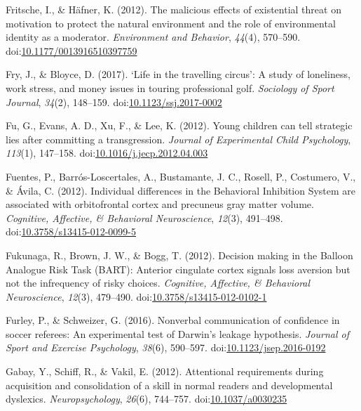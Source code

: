 \documentclass[english,man]{apa6}
\begin{document}
\hypertarget{ref-Fritsche2012}{}
Fritsche, I., \& Häfner, K. (2012). The malicious effects of existential
threat on motivation to protect the natural environment and the role of
environmental identity as a moderator. \emph{Environment and Behavior},
\emph{44}(4), 570--590.
doi:\href{https://doi.org/10.1177/0013916510397759}{10.1177/0013916510397759}

\hypertarget{ref-Fry2017}{}
Fry, J., \& Bloyce, D. (2017). `Life in the travelling circus': A study
of loneliness, work stress, and money issues in touring professional
golf. \emph{Sociology of Sport Journal}, \emph{34}(2), 148--159.
doi:\href{https://doi.org/10.1123/ssj.2017-0002}{10.1123/ssj.2017-0002}

\hypertarget{ref-Fu2012}{}
Fu, G., Evans, A. D., Xu, F., \& Lee, K. (2012). Young children can tell
strategic lies after committing a transgression. \emph{Journal of
Experimental Child Psychology}, \emph{113}(1), 147--158.
doi:\href{https://doi.org/10.1016/j.jecp.2012.04.003}{10.1016/j.jecp.2012.04.003}

\hypertarget{ref-Fuentes2012}{}
Fuentes, P., Barrós-Loscertales, A., Bustamante, J. C., Rosell, P.,
Costumero, V., \& Ávila, C. (2012). Individual differences in the
Behavioral Inhibition System are associated with orbitofrontal cortex
and precuneus gray matter volume. \emph{Cognitive, Affective, \&
Behavioral Neuroscience}, \emph{12}(3), 491--498.
doi:\href{https://doi.org/10.3758/s13415-012-0099-5}{10.3758/s13415-012-0099-5}

\hypertarget{ref-Fukunaga2012}{}
Fukunaga, R., Brown, J. W., \& Bogg, T. (2012). Decision making in the
Balloon Analogue Risk Task (BART): Anterior cingulate cortex signals
loss aversion but not the infrequency of risky choices. \emph{Cognitive,
Affective, \& Behavioral Neuroscience}, \emph{12}(3), 479--490.
doi:\href{https://doi.org/10.3758/s13415-012-0102-1}{10.3758/s13415-012-0102-1}

\hypertarget{ref-Furley2016}{}
Furley, P., \& Schweizer, G. (2016). Nonverbal communication of
confidence in soccer referees: An experimental test of Darwin's leakage
hypothesis. \emph{Journal of Sport and Exercise Psychology},
\emph{38}(6), 590--597.
doi:\href{https://doi.org/10.1123/jsep.2016-0192}{10.1123/jsep.2016-0192}

\hypertarget{ref-Gabay2012}{}
Gabay, Y., Schiff, R., \& Vakil, E. (2012). Attentional requirements
during acquisition and consolidation of a skill in normal readers and
developmental dyslexics. \emph{Neuropsychology}, \emph{26}(6), 744--757.
doi:\href{https://doi.org/10.1037/a0030235}{10.1037/a0030235}
\end{document}
